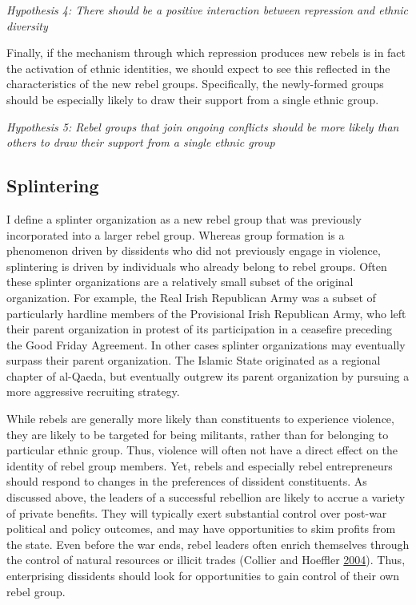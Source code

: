 \documentclass[12pt,]{book}
\theoremstyle{definition}
\theoremstyle{definition}
\theoremstyle{definition}
\theoremstyle{remark}
\begin{document}
\emph{Hypothesis 4: There should be a positive interaction between
repression and ethnic diversity}

Finally, if the mechanism through which repression produces new rebels
is in fact the activation of ethnic identities, we should expect to see
this reflected in the characteristics of the new rebel groups.
Specifically, the newly-formed groups should be especially likely to
draw their support from a single ethnic group.

\emph{Hypothesis 5: Rebel groups that join ongoing conflicts should be
more likely than others to draw their support from a single ethnic
group}

\hypertarget{splintering-1}{%
\subsection{Splintering}\label{splintering-1}}

I define a splinter organization as a new rebel group that was
previously incorporated into a larger rebel group. Whereas group
formation is a phenomenon driven by dissidents who did not previously
engage in violence, splintering is driven by individuals who already
belong to rebel groups. Often these splinter organizations are a
relatively small subset of the original organization. For example, the
Real Irish Republican Army was a subset of particularly hardline members
of the Provisional Irish Republican Army, who left their parent
organization in protest of its participation in a ceasefire preceding
the Good Friday Agreement. In other cases splinter organizations may
eventually surpass their parent organization. The Islamic State
originated as a regional chapter of al-Qaeda, but eventually outgrew its
parent organization by pursuing a more aggressive recruiting strategy.

While rebels are generally more likely than constituents to experience
violence, they are likely to be targeted for being militants, rather
than for belonging to particular ethnic group. Thus, violence will often
not have a direct effect on the identity of rebel group members. Yet,
rebels and especially rebel entrepreneurs should respond to changes in
the preferences of dissident constituents. As discussed above, the
leaders of a successful rebellion are likely to accrue a variety of
private benefits. They will typically exert substantial control over
post-war political and policy outcomes, and may have opportunities to
skim profits from the state. Even before the war ends, rebel leaders
often enrich themselves through the control of natural resources or
illicit trades (Collier and Hoeffler
\protect\hyperlink{ref-Collier2004}{2004}). Thus, enterprising
dissidents should look for opportunities to gain control of their own
rebel group.
\end{document}
